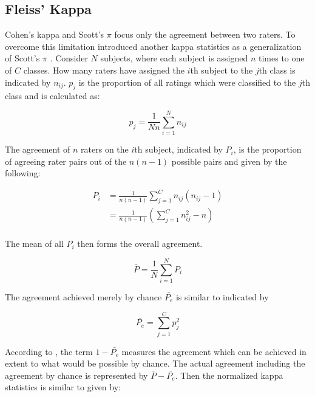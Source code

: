 \subsection{Fleiss' Kappa}
\label{chp:fundamentals:sec:inter_rater_agreement:subsec:fleiss_kappa}
Cohen's kappa and Scott's $\pi$ focus only the agreement between two raters.
To overcome this limitation \textcite{Fleiss:1971} introduced another kappa statistics as a generalization of Scott's $\pi$ \parencite{Scott:1955}.
Consider $N$ subjects, where each subject is assigned $n$ times to one of $C$ classes.
How many raters have assigned the $i$th subject to the $j$th class is indicated by $n_{ij}$.
$p_j$ is the proportion of all ratings which were classified to the $j$th class and is calculated as:

\begin{equation}\label{eq:fleiss_pj}
    p_j = \frac{1}{Nn}\sum_{i=1}^N n_{ij}
\end{equation}

The agreement of $n$ raters on the $i$th subject, indicated by $P_i$, is the proportion of agreeing rater pairs out of the $n(n-1)$ possible pairs and given by the following:

\begin{equation}\label{eq:fleiss_Pi}
    \begin{aligned}
        P_i &= \frac{1}{n(n-1)} \sum_{j=1}^C n_{ij} (n_{ij}-1) \\
        &= \frac{1}{n(n-1)} (\sum_{j=1}^C n_{ij}^2 - n)\\
    \end{aligned}
\end{equation}

The mean of all $P_i$ then forms the overall agreement.

\begin{equation}\label{eq:fleiss_P_bar}
    \bar{P} = \frac{1}{N} \sum_{i=1}^N P_i
\end{equation}

The agreement achieved merely by chance $\bar{P_e}$ is similar to \textcite{Scott:1955} indicated by

\begin{equation}\label{eq:fleiss_P_e}
    \bar{P_e} = \sum_{j=1}^C p_j^2
\end{equation}

According to \textcite{Fleiss:1971}, the term $1-\bar{P_e}$ measures the agreement which can be achieved in extent to what would be possible by chance.
The actual agreement including the agreement by chance is represented by $\bar{P} - \bar{P_e}$.
Then the normalized kappa statistics is similar to \textcite{Cohen:1960} given by:

